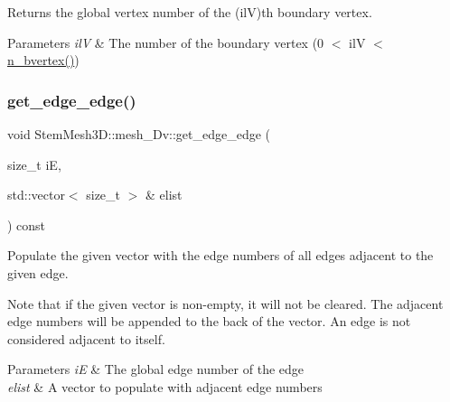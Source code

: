 Returns the global vertex number of the (ilV)\textquotesingle{}th boundary vertex. 


\begin{DoxyParams}{Parameters}
{\em ilV} & The number of the boundary vertex (0 $<$ ilV $<$ \hyperlink{classStemMesh3D_1_1mesh__3Dv_a616550f2a459b5c239d2d205a408b484}{n\+\_\+bvertex()}) \\
\hline
\end{DoxyParams}
\mbox{\label{classStemMesh3D_1_1mesh__3Dv_a06babc4d9918195a426c4800dec47979}} 
\subsubsection{\texorpdfstring{get\+\_\+edge\+\_\+edge()}{get\_edge\_edge()}}
{\footnotesize\ttfamily void Stem\+Mesh3\+D\+::mesh\+\_\+Dv\+::get\+\_\+edge\+\_\+edge (\begin{DoxyParamCaption}\item[{size\+\_\+t}]{iE,  }\item[{std\+::vector$<$ size\+\_\+t $>$ \&}]{elist }\end{DoxyParamCaption}) const}



Populate the given vector with the edge numbers of all edges adjacent to the given edge. 

Note that if the given vector is non-\/empty, it will not be cleared. The adjacent edge numbers will be appended to the back of the vector. An edge is not considered adjacent to itself. 
\begin{DoxyParams}{Parameters}
{\em iE} & The global edge number of the edge \\
\hline
{\em elist} & A vector to populate with adjacent edge numbers \\
\hline
\end{DoxyParams}
\mbox{\label{classStemMesh3D_1_1mesh__3Dv_acfc3f5d372d82b08180391776e0e5b85}} 
